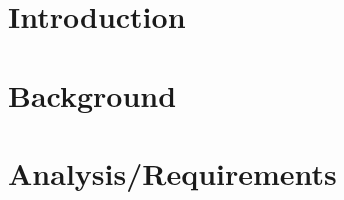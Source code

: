 \documentclass{l4proj}
\begin{document}
%
%
%
%
%
%
%
\chapter{Introduction}


\chapter{Background}

\chapter{Analysis/Requirements}

\end{document}
